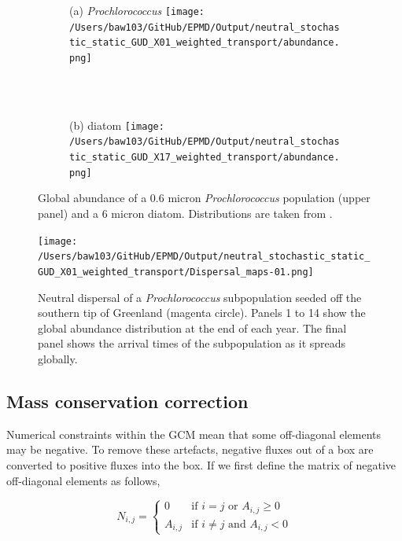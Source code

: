 \documentclass[12pt]{article}
\begin{document}
\begin{figure}[htp]
        \centering
\begin{subfigure}{0.8\textwidth}
        \centering
        (a) \textit{Prochlorococcus}
         \texttt{[image: /Users/baw103/GitHub/EPMD/Output/neutral\_stochastic\_static\_GUD\_X01\_weighted\_transport/abundance.png]}
    \end{subfigure}%
    \\
\begin{subfigure}{0.8\textwidth}
        \centering
        ~\\(b) diatom
         \texttt{[image: /Users/baw103/GitHub/EPMD/Output/neutral\_stochastic\_static\_GUD\_X17\_weighted\_transport/abundance.png]}
    \end{subfigure}%
    \caption{Global abundance of a 0.6 micron \textit{Prochlorococcus} population (upper panel) and a 6 micron diatom. Distributions are taken from \citep{Dutkiewicz:2019}.}
\label{Abundances}
\end{figure}

\begin{figure}[htp!]
\texttt{[image: /Users/baw103/GitHub/EPMD/Output/neutral\_stochastic\_static\_GUD\_X01\_weighted\_transport/Dispersal\_maps-01.png]}
\caption{Neutral dispersal of a \textit{Prochlorococcus} subpopulation seeded off the southern tip of Greenland (magenta circle). Panels 1 to 14 show the global abundance distribution at the end of each year. The final panel shows the arrival times of the subpopulation as it spreads globally.}
\label{Schematic}
\end{figure}



\subsection{Mass conservation correction}

Numerical constraints within the GCM mean that some off-diagonal elements may be negative. To remove these artefacts, negative fluxes out of a box are converted to positive fluxes into the box. If we first define the matrix of negative off-diagonal elements as follows,

\begin{equation}
N_{i,j} = 
\begin{cases}
0 		& \text{if $i=j$ or $A_{i,j}\ge 0$}\\
A_{i,j} 	& \text{if $i\ne j$ and $A_{i,j}<0 $}
\end{cases}
\end{equation}
\end{document}
